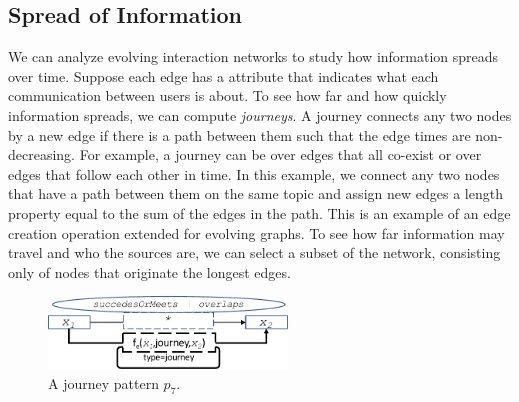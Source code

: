 \subsection{ Spread of Information} 

We can analyze evolving interaction networks to study how information
spreads over time.  Suppose each edge has a  attribute
that indicates what each communication between users is about.  To see
how far and how quickly information spreads, we can compute {\em
  journeys}.  A journey connects any two nodes by a new edge if there
is a path between them such that the edge times are non-decreasing.
For example, a journey can be over edges that all co-exist or over
edges that follow each other in time.  In this example, we connect any
two nodes that have a path between them on the same topic and assign
new edges a length property equal to the sum of the edges in the path.
This is an example of an edge creation operation extended for evolving
graphs.  To see how far information may travel and who the sources
are, we can select a subset of the network, consisting only of nodes
that originate the longest edges.

\begin{figure}
\centering
\includegraphics[width=2.5in]{figs/journeys.pdf}
\vspace{-0.2cm}
\caption{A journey pattern $p_7$.}
\label{fig:journeysp}
\vspace{-0.2cm}
\end{figure}

